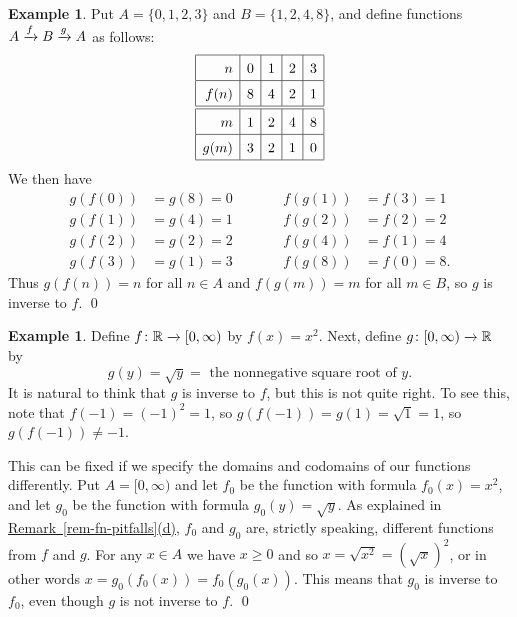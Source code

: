 \documentclass[a4paper]{book}
\theoremstyle{definition}
\newtheorem{example}[theorem]{Example}
\begin{document}
\begin{example}
 Put $A=\{0,1,2,3\}$ and $B=\{1,2,4,8\}$, and define functions
 $A\xrightarrow{f}B\xrightarrow{g}A$ as follows:
 \[ \renewcommand{\arraystretch}{1.5}
  \begin{array}{|r|c|c|c|c|}
   \hline
    n    & 0 & 1 & 2 & 3 \\
   \hline
    f(n) & 8 & 4 & 2 & 1 \\ 
   \hline\hline
    m    & 1 & 2 & 4 & 8 \\
   \hline
    g(m) & 3 & 2 & 1 & 0 \\
   \hline
  \end{array}
 \]
 We then have 
 \[ \renewcommand{\arraystretch}{1.5}
  \begin{array}{rlcrl}
   g(f(0)) &= g(8) = 0 & \qquad & f(g(1)) &= f(3) = 1 \\
   g(f(1)) &= g(4) = 1 & \qquad & f(g(2)) &= f(2) = 2 \\
   g(f(2)) &= g(2) = 2 & \qquad & f(g(4)) &= f(1) = 4 \\
   g(f(3)) &= g(1) = 3 & \qquad & f(g(8)) &= f(0) = 8.
  \end{array}
 \]
 Thus $g(f(n))=n$ for all $n\in A$ and $f(g(m))=m$ for all $m\in B$,
 so $g$ is inverse to $f$. \qed
\end{example}
\begin{example}
 Define $f\colon{\mathbb{R}}\xrightarrow{}[0,\infty)$ by $f(x)=x^2$.  Next, define
 $g\colon[0,\infty)\xrightarrow{}{\mathbb{R}}$ by 
 \[ g(y) = \sqrt{y} = \text{ the nonnegative square root of } y. \]
 It is natural to think that $g$ is inverse to $f$, but this is not
 quite right.  To see this, note that $f(-1)=(-1)^2=1$, so
 $g(f(-1))=g(1)=\sqrt{1}=1$, so $g(f(-1))\neq -1$.
 
 This can be fixed if we specify the domains and codomains of our
 functions differently.  Put $A=[0,\infty)$ and let $f_0$ be the
 function  with formula $f_0(x)=x^2$, and let
 $g_0$ be the function  with formula
 $g_0(y)=\sqrt{y}$.  As explained in
 \hyperlink{rem-fn-pitfalls}{Remark~\ref{rem-fn-pitfalls}(d)}, $f_0$
 and $g_0$ are, strictly speaking, different functions from $f$ and
 $g$.  For any $x\in A$ we have $x\geq 0$ and so
 $x=\sqrt{x^2}=(\sqrt{x})^2$, or in other words
 $x=g_0(f_0(x))=f_0(g_0(x))$.  This means that $g_0$ is inverse to
 $f_0$, even though $g$ is not inverse to $f$. \qed
\end{example}
\end{document}
